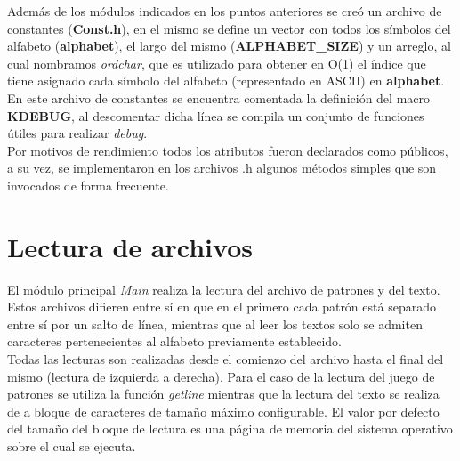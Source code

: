 Además de los módulos indicados en los puntos anteriores se creó un archivo de constantes ({\bf Const.h}), en el mismo se define un vector con todos los símbolos del alfabeto ({\bf alphabet}), el largo del mismo ({\bf ALPHABET\_SIZE}) y un arreglo, al cual nombramos \emph{ordchar}, que es utilizado para obtener en O(1) el índice que tiene asignado cada símbolo del alfabeto (representado en ASCII) en {\bf alphabet}. En este archivo de constantes se encuentra comentada la definición del macro {\bf KDEBUG}, al descomentar dicha línea se compila un conjunto de funciones útiles para realizar {\it debug}.\\
Por motivos de rendimiento todos los atributos fueron declarados como públicos, a su vez, se implementaron en los archivos .h algunos métodos simples que son invocados de forma frecuente.
\section{Lectura de archivos}
El módulo principal {\it Main} realiza la lectura del archivo de patrones y del texto. Estos archivos difieren entre sí en que en el primero cada patrón está separado entre sí por un salto de línea, mientras que al leer los textos solo se admiten caracteres pertenecientes al alfabeto previamente establecido.\\
Todas las lecturas son realizadas desde el comienzo del archivo hasta el final del mismo (lectura de izquierda a derecha). Para el caso de la lectura del juego de patrones se utiliza la función {\it getline} mientras que la lectura del texto se realiza de a bloque de caracteres de tamaño máximo configurable. El valor por defecto del tamaño del bloque de lectura es una página de memoria del sistema operativo sobre el cual se ejecuta.\\
